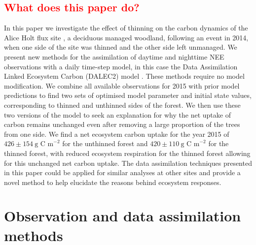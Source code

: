 \documentclass[draft,linenumbers]{agujournal}
\begin{document}
\subsection{\textcolor{red}{What does this paper do?}}
In this paper we investigate the effect of thinning on the carbon dynamics of the Alice Holt flux site \citep{wilkinson2012inter}, a deciduous managed woodland, following an event in 2014, when one side of the site was thinned and the other side left unmanaged. 
We present new methods for the assimilation of daytime and nighttime NEE observations with a daily time-step model, in this case the Data Assimilation Linked Ecosystem Carbon (DALEC2) model \citep{Bloom2015}. These methods require no model modification. We combine all available observations for 2015 with prior model predictions to find two sets of optimised model parameter and initial state values, corresponding to thinned and unthinned sides of the forest. We then use these two versions of the model to seek an explanation for why the net uptake of carbon remains unchanged even after removing a large proportion of the trees from one side. We find a net ecosystem carbon uptake for the year 2015 of \(426 \pm 154~\text{g C m}^{-2}\) for the unthinned forest and \(420 \pm 110~\text{g C m}^{-2}\) for the thinned forest, with reduced ecosystem respiration for the thinned forest allowing for this unchanged net carbon uptake. The data assimilation techniques presented in this paper could be applied for similar analyses at other sites and provide a novel method to help elucidate the reasons behind ecosystem responses.      

\section{Observation and data assimilation methods}
\end{document}
